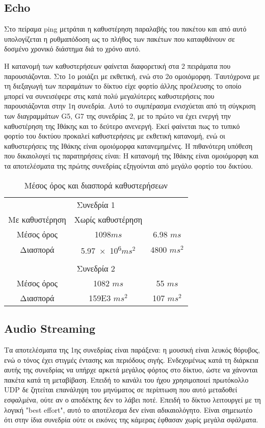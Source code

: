 \documentclass[a4paper,10pt]{article}
\begin{document}
\subsection{\foreignlanguage{english}{Echo}}
Στο πείραμα \foreignlanguage{english}{ping} μετράται η καθυστέρηση παραλαβής του πακέτου και από αυτό υπολογίζεται η ρυθμαπόδοση ως το πλήθος των πακέτων που καταφθάνουν σε δοσμένο χρονικό διάστημα διά το χρόνο αυτό.

Η κατανομή των καθυστερήσεων φαίνεται διαφορετική στα 2 πειράματα που παρουσιάζονται. Στο 1ο μοιάζει με εκθετική, ενώ στο 2ο ομοιόμορφη. Ταυτόχρονα με τη διεξαγωγή των πειραμάτων το δίκτυο είχε φορτίο άλλης προέλευσης το οποίο μπορεί να συνεισέφερε στις κατά πολύ μεγαλύτερες καθυστερήσεις που παρουσιάζονται στην 1η συνεδρία. Αυτό το συμπέρασμα ενισχύεται από τη σύγκριση των διαγραμμάτων \foreignlanguage{english}{G5, G7} της συνεδρίας 2, με το πρώτο να έχει ενεργή την καθυστέρηση της Ιθάκης και το δεύτερο ανενεργή. Εκεί φαίνεται πως το τυπικό φορτίο του δικτύου προκαλεί καθυστερήσεις με εκθετική κατανομή, ενώ οι καθυστερήσεις της Ιθάκης είναι ομοιόμορφα κατανεμημένες. Η πιθανότερη υπόθεση που δικαιολογεί τις παρατηρήσεις είναι: Η κατανομή της Ιθάκης είναι ομοιόμορφη και τα αποτελέσματα της πρώτης συνεδρίας εξηγούνται από μεγάλο φορτίο του δικτύου.

\begin{table}
	\centering
	\begin{tabular}{c|cc}
	  \multicolumn{3}{c}{Συνεδρία 1}\\
		Με καθυστέρηση & Χωρίς καθυστέρηση\\
		\hline
		Μέσος όρος & \num{1098}$ms$ & \num{6.98} $ms$\\
		Διασπορά & \num{5.97e+6}$ms^2$ & \num{4800} $ms^2$\\
		\\
		\multicolumn{3}{c}{Συνεδρία 2}\\
		\hline
		Μέσος όρος & \num{1082} $ms$ & \num{55} $ms$\\
		Διασπορά & \num{159E3} $ms^2$ & \num{107} $ms^2$
	\end{tabular}

	\caption{Μέσος όρος και διασπορά καθυστερήσεων}
\end{table}

\subsection{\foreignlanguage{english}{Audio Streaming}}
Τα αποτελέσματα της 1ης συνεδρίας είναι παράξενα: η μουσική είναι λευκός θόρυβος, ενώ ο τόνος έχει στιγμές έντασης και περιόδους σιγής. Ενδεχομένως κατά τη διάρκεια αυτής της συνεδρίας να υπήρχε αρκετά μεγάλος φόρτος στο δίκτυο, ώστε να χάνονται πακέτα κατά τη μεταβίβαση. Επειδή το κανάλι του ήχου χρησιμοποιεί πρωτόκολλο \foreignlanguage{english}{UDP} δε ζητείται επανάληψη του μηνύματος σε περίπτωση που αυτό μεταδοθεί εσφαλμένα, ούτε αν ο αποδέκτης δεν το λάβει ποτέ. Επειδή το δίκτυο λειτουργεί με τη λογική \foreignlanguage{english}{"best effort"}, αυτό το αποτέλεσμα δεν είναι αδικαιολόγητο. Είναι σημειωτέο ότι στην ίδια συνεδρία ούτε οι εικόνες της κάμερας έφθασαν χωρίς μεγάλα σφάλματα.
\end{document}
